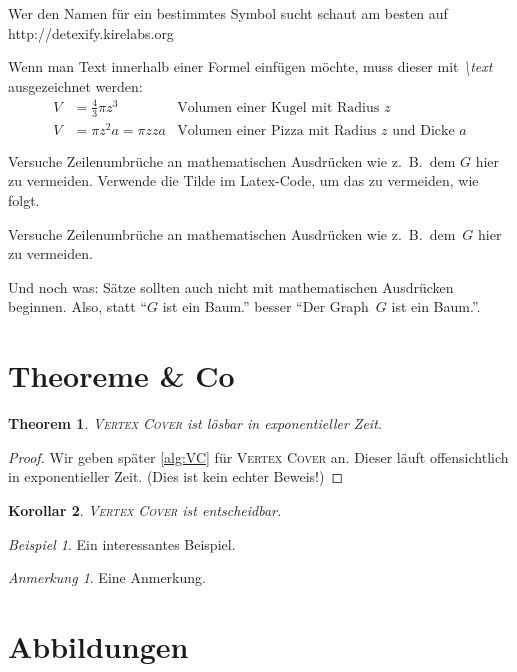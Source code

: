 \documentclass[a4paper,onecolumn,oneside,12pt,ngerman]{article}
\theoremstyle{plain} %
\newtheorem{theorem}{Theorem}[section]
\newtheorem{corollary}[theorem]{Korollar}
\theoremstyle{definition} %
\theoremstyle{remark} %
\newtheorem{example}{Beispiel}
\newtheorem*{remark}{Anmerkung}
\theoremstyle{plain}
\begin{document}
Wer den Namen für ein bestimmtes Symbol sucht schaut am besten auf http://detexify.kirelabs.org

Wenn man Text innerhalb einer Formel einfügen möchte, muss dieser mit \textit{\textbackslash text} ausgezeichnet werden:
\begin{align*}
V &= \frac{4}{3} \pi z^3 & \text{Volumen einer Kugel mit Radius $z$}\\
V &= \pi z^2 a = \pi zza & \text{Volumen einer Pizza mit Radius $z$ und Dicke $a$}
\end{align*}

Versuche Zeilenumbrüche an mathematischen Ausdrücken wie z.\ B.\ dem $G$ hier zu vermeiden.
Verwende die Tilde im Latex-Code, um das zu vermeiden, wie folgt.

Versuche Zeilenumbrüche an mathematischen Ausdrücken wie z.\ B.\ dem~$G$ hier zu vermeiden.

Und noch was: Sätze sollten auch nicht mit mathematischen Ausdrücken beginnen.
Also, statt \enquote{$G$ ist ein Baum.} besser \enquote{Der Graph~$G$ ist ein Baum.}.


\section{Theoreme \& Co}

\begin{theorem}
	\label{thm:exponentialzeit}
	\textsc{Vertex Cover} ist lösbar in exponentieller Zeit.
\end{theorem}
\begin{proof}
	Wir geben später \cref{alg:VC} für \textsc{Vertex Cover} an.
	Dieser läuft offensichtlich in exponentieller Zeit.
	(Dies ist kein echter Beweis!)
\end{proof}

\begin{corollary}\label{thm:entscheidbar}
	\textsc{Vertex Cover} ist entscheidbar.
\end{corollary}

\begin{example}
	Ein interessantes Beispiel.
\end{example}

\begin{remark}
	Eine Anmerkung.
\end{remark}


\section{Abbildungen}
\end{document}
